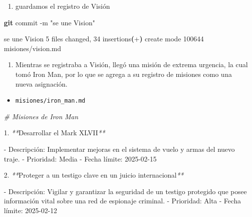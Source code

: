 \documentclass[
]{book}
\newenvironment{Shaded}{\begin{snugshade}}{\end{snugshade}}
\newcommand{\AttributeTok}[1]{\textcolor[rgb]{0.13,0.29,0.53}{#1}}
\newcommand{\CommentTok}[1]{\textcolor[rgb]{0.56,0.35,0.01}{\textit{#1}}}
\newcommand{\ErrorTok}[1]{\textcolor[rgb]{0.64,0.00,0.00}{\textbf{#1}}}
\newcommand{\ExtensionTok}[1]{#1}
\newcommand{\FunctionTok}[1]{\textcolor[rgb]{0.13,0.29,0.53}{\textbf{#1}}}
\newcommand{\KeywordTok}[1]{\textcolor[rgb]{0.13,0.29,0.53}{\textbf{#1}}}
\newcommand{\NormalTok}[1]{#1}
\newcommand{\PreprocessorTok}[1]{\textcolor[rgb]{0.56,0.35,0.01}{\textit{#1}}}
\newcommand{\StringTok}[1]{\textcolor[rgb]{0.31,0.60,0.02}{#1}}
\providecommand{\tightlist}{%
  \setlength{\itemsep}{0pt}\setlength{\parskip}{0pt}}
\begin{document}
\begin{enumerate}
\def\labelenumi{\arabic{enumi}.}
\setcounter{enumi}{2}
\tightlist
\item
  guardamos el registro de Visión
\end{enumerate}

\begin{Shaded}
\begin{Highlighting}[]
\FunctionTok{git}\NormalTok{ commit }\AttributeTok{{-}m} \StringTok{"se une Vision"}
\end{Highlighting}
\end{Shaded}

\begin{Shaded}
\begin{Highlighting}[]
\ExtensionTok{[main}\NormalTok{ 8531ef2] se une Vision}
 \ExtensionTok{5}\NormalTok{ files changed, 34 insertions}\ErrorTok{(}\ExtensionTok{+}\KeywordTok{)}
 \ExtensionTok{create}\NormalTok{ mode 100644 misiones/vision.md}
\end{Highlighting}
\end{Shaded}

\begin{enumerate}
\def\labelenumi{\arabic{enumi}.}
\setcounter{enumi}{3}
\tightlist
\item
  Mientras se registraba a Visión, llegó una misión de extrema urgencia, la cual tomó Iron Man, por lo que se agrega a su registro de misiones como una nueva asignación.
\end{enumerate}

\begin{itemize}
\tightlist
\item
  \texttt{misiones/iron\_man.md}
\end{itemize}

\begin{Shaded}
\begin{Highlighting}[]
\CommentTok{\# Misiones de Iron Man}

\ExtensionTok{1.} \PreprocessorTok{**}\NormalTok{Desarrollar el Mark XLVII}\PreprocessorTok{**}

   \ExtensionTok{{-}}\NormalTok{ Descripción: Implementar mejoras en el sistema de vuelo y armas del nuevo traje.}
   \ExtensionTok{{-}}\NormalTok{ Prioridad: Media}
   \ExtensionTok{{-}}\NormalTok{ Fecha límite: 2025{-}02{-}15}

\ExtensionTok{2.} \PreprocessorTok{**}\NormalTok{Proteger a un testigo clave en un juicio internacional}\PreprocessorTok{**}

   \ExtensionTok{{-}}\NormalTok{ Descripción: Vigilar y garantizar la seguridad de un testigo protegido que posee información vital sobre una red de espionaje criminal.}
   \ExtensionTok{{-}}\NormalTok{ Prioridad: Alta}
   \ExtensionTok{{-}}\NormalTok{ Fecha límite: 2025{-}02{-}12}
\end{Highlighting}
\end{Shaded}
\end{document}
